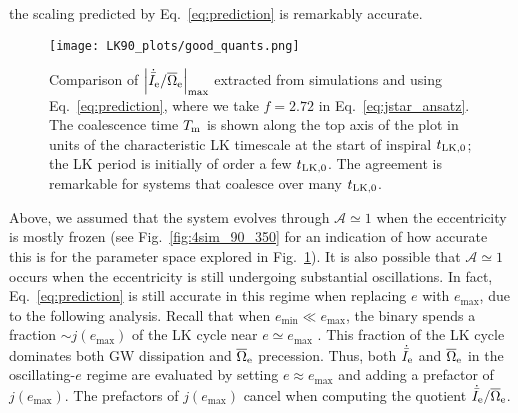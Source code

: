\documentclass[
        twocolumn,
        twocolappendix
    ]{aastex63}
\newcommand*{\abs}[1]{\left|#1\right|}
\begin{document}
the scaling predicted by Eq.~\eqref{eq:prediction} is remarkably accurate.
\begin{figure}
    \centering
    \texttt{[image: LK90\_plots/good\_quants.png]}
    \caption{Comparison of $\abs{\dot{\bar{I}}_{\rm e} / \overline{\Omega}_{\rm
    e}}_{\max}$ extracted from simulations and using Eq.~\eqref{eq:prediction},
    where we take $f = 2.72$ in Eq.~\eqref{eq:jstar_ansatz}. The coalescence time
    $T_{\rm m}$ is shown along the top axis of the plot in units of the
    characteristic LK timescale at the start of inspiral $t_{\rm LK, 0}$; the LK
    period is initially of order a few $t_{\rm LK, 0}$. The agreement is
    remarkable for systems that coalesce over many $t_{\rm LK, 0}$.
    }\label{fig:good_quants}
\end{figure}

Above, we assumed that the system evolves through $\mathcal{A} \simeq 1$  when
the eccentricity is mostly frozen (see Fig.~\ref{fig:4sim_90_350} for an
indication of how accurate this is for the parameter space explored in
Fig.~\ref{fig:good_quants}). It is also possible that $\mathcal{A} \simeq 1$
occurs when the eccentricity is still undergoing substantial oscillations. In
fact, Eq.~\eqref{eq:prediction} is still accurate in this regime when replacing
$e$ with $e_{\max}$, due to the following analysis. Recall that when $e_{\min}
\ll e_{\max}$, the binary spends a fraction $\sim j(e_{\max})$ of the LK cycle
near $e \simeq e_{\max}$ \citep{anderson2016formation}. This fraction of the LK
cycle dominates both GW dissipation and $\overline{\Omega}_{\rm e}$ precession.
Thus, both $\dot{\bar{I}}_{\rm e}$ and $\overline{\Omega}_{\rm e}$ in the
oscillating-$e$ regime are evaluated by setting $e \approx e_{\max}$ and adding
a prefactor of $j(e_{\max})$. The prefactors of $j(e_{\max})$ cancel when
computing the quotient $\dot{\bar{I}}_{\rm e} / \overline{\Omega}_{\rm e}$.
\end{document}
